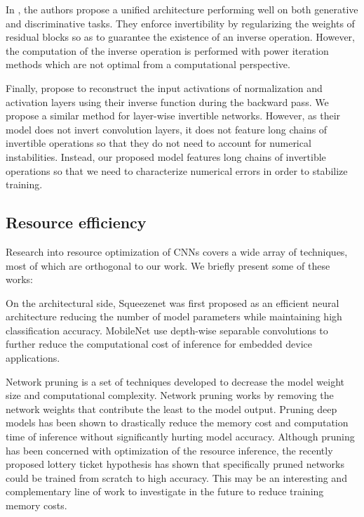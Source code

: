 \documentclass[twocolumn]{bmcart}
\begin{document}
In \cite{behrmann2018invertible}, the authors propose a unified architecture performing well on both generative and discriminative tasks.
They enforce invertibility by regularizing the weights of residual blocks so as to guarantee the existence of an inverse operation.
However, the computation of the inverse operation is performed with power iteration methods which are not optimal from a computational perspective.

Finally, \cite{rota2018place} propose to reconstruct the input activations of normalization and activation layers using their inverse function during the backward pass.
We propose a similar method for layer-wise invertible networks. 
However, as their model does not invert convolution layers, 
it does not feature long chains of invertible operations so that they do not  need to account for numerical instabilities.
Instead, our proposed model features long chains of invertible operations so that we need to characterize numerical errors in order to stabilize training.

\subsection{Resource efficiency}

Research into resource optimization of CNNs covers a wide array of techniques, most of which are orthogonal to our work. We briefly present some of these works:

On the architectural side, Squeezenet \cite{iandola2016squeezenet} was first proposed as an efficient neural architecture reducing the number of model parameters while maintaining high classification accuracy.
MobileNet \cite{howard2017mobilenets} use depth-wise separable convolutions to further reduce the computational cost of inference for embedded device applications.

Network pruning is a set of techniques \cite{molchanov2016pruning} developed to decrease the model weight size and computational complexity.
Network pruning works by removing the network weights that contribute the least to the model output.
Pruning deep models has been shown to drastically reduce the memory cost and computation time of inference without  significantly hurting model accuracy.
Although pruning has been concerned with optimization of the resource inference, the recently proposed lottery ticket hypothesis \cite{frankle2018lottery} has shown that specifically pruned networks could  be trained from scratch to high accuracy.
This may be an interesting and complementary line of work to investigate in the future to reduce training memory costs.
\end{document}
